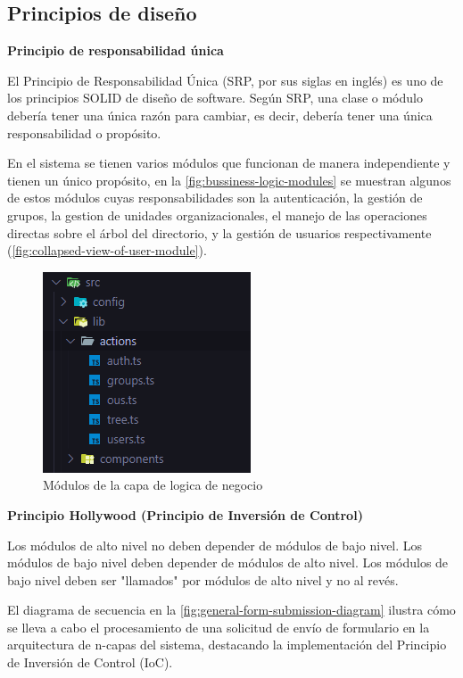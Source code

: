 \subsection{Principios de diseño}

\textbf{Principio de responsabilidad única}

El Principio de Responsabilidad Única (SRP, por sus siglas en inglés) es uno de los principios SOLID de diseño de software. Según SRP, una clase o módulo debería tener una única razón para cambiar, es decir, debería tener una única responsabilidad o propósito.

En el sistema se tienen varios módulos que funcionan de manera independiente y tienen un único propósito, en la \autoref{fig:bussiness-logic-modules} se muestran algunos de estos módulos cuyas responsabilidades son la autenticación, la gestión de grupos, la gestion de unidades organizacionales, el manejo de las operaciones directas sobre el árbol del directorio, y la gestión de usuarios respectivamente (\autoref{fig:collapsed-view-of-user-module}).

\begin{figure}[H]
    \centering
    \includegraphics{images/code/bussiness-logic-modules.png}
    \caption{Módulos de la capa de logica de negocio}
    \label{fig:bussiness-logic-modules}
\end{figure}

\textbf{Principio Hollywood (Principio de Inversión de Control)}

Los módulos de alto nivel no deben depender de módulos de bajo nivel. Los módulos de bajo nivel deben depender de módulos de alto nivel. Los módulos de bajo nivel deben ser "llamados" por módulos de alto nivel y no al revés.

El diagrama de secuencia en la \autoref{fig:general-form-submission-diagram} ilustra cómo se lleva a cabo el procesamiento de una solicitud de envío de formulario en la arquitectura de n-capas del sistema, destacando la implementación del Principio de Inversión de Control (IoC).

